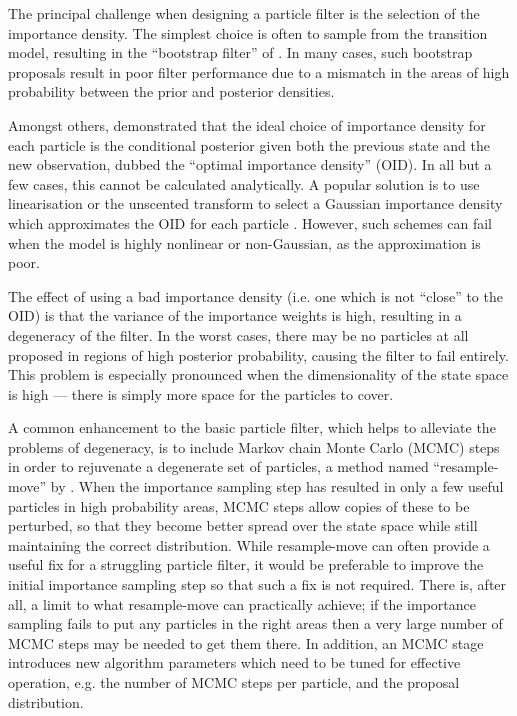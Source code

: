 \documentclass{article}
\begin{document}
The principal challenge when designing a particle filter is the selection of the importance density. The simplest choice is often to sample from the transition model, resulting in the ``bootstrap filter'' of \citep{Gordon1993}. In many cases, such bootstrap proposals result in poor filter performance due to a mismatch in the areas of high probability between the prior and posterior densities.

Amongst others, \citet{Doucet2000a} demonstrated that the ideal choice of importance density for each particle is the conditional posterior given both the previous state and the new observation, dubbed the ``optimal importance density'' (OID). In all but a few cases, this cannot be calculated analytically. A popular solution is to use linearisation or the unscented transform to select a Gaussian importance density which approximates the OID for each particle \citep{Doucet2000a,Merwe2000}. However, such schemes can fail when the model is highly nonlinear or non-Gaussian, as the approximation is poor.

The effect of using a bad importance density (i.e. one which is not ``close'' to the OID) is that the variance of the importance weights is high, resulting in a degeneracy of the filter. In the worst cases, there may be no particles at all proposed in regions of high posterior probability, causing the filter to fail entirely. This problem is especially pronounced when the dimensionality of the state space is high --- there is simply more space for the particles to cover.

A common enhancement to the basic particle filter, which helps to alleviate the problems of degeneracy, is to include Markov chain Monte Carlo (MCMC) steps in order to rejuvenate a degenerate set of particles, a method named ``resample-move'' by \citet{Gilks2001}. When the importance sampling step has resulted in only a few useful particles in high probability areas, MCMC steps allow copies of these to be perturbed, so that they become better spread over the state space while still maintaining the correct distribution. While resample-move can often provide a useful fix for a struggling particle filter, it would be preferable to improve the initial importance sampling step so that such a fix is not required. There is, after all, a limit to what resample-move can practically achieve; if the importance sampling fails to put any particles in the right areas then a very large number of MCMC steps may be needed to get them there. In addition, an MCMC stage introduces new algorithm parameters which need to be tuned for effective operation, e.g. the number of MCMC steps per particle, and the proposal distribution.
\end{document}
